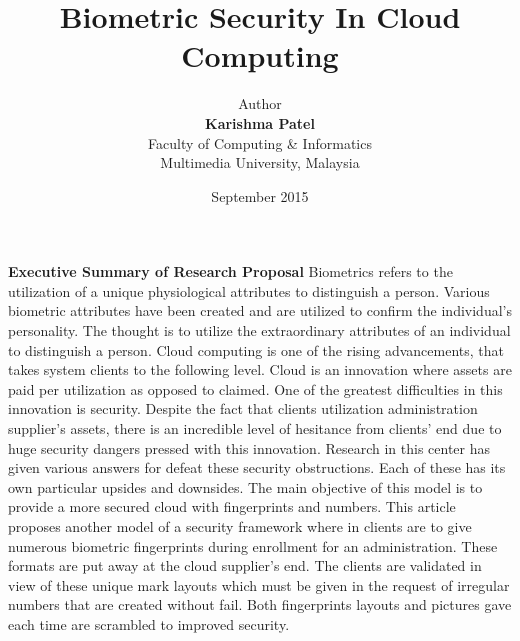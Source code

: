 \documentclass[12pt]{article}
\title{\textbf{Biometric Security In Cloud Computing}}
\date{September 2015}
\author{
Author\\
\textbf{Karishma Patel}\\
Faculty of Computing \& Informatics\\
Multimedia University, Malaysia}
\begin{document}
\begin{titlepage}
\maketitle
\end{titlepage}

\textbf{\large Executive Summary of Research Proposal} \newline \newline \newline
Biometrics refers to the utilization of a unique physiological attributes to distinguish a person. Various biometric attributes have been created and are utilized to confirm the individual's personality. The thought is to utilize the extraordinary attributes of an individual to distinguish a person. Cloud computing is one of the rising advancements, that takes system clients to the following level. Cloud is an innovation where assets are paid per utilization as opposed to claimed. One of the greatest difficulties in this innovation is security. Despite the fact that clients utilization administration supplier's assets, there is an incredible level of hesitance from clients' end due to huge security dangers pressed with this innovation. Research in this center has given various answers for defeat these security obstructions. Each of these has its own particular upsides and downsides. The main objective of this model is to provide a more secured cloud with fingerprints and numbers. This article proposes another model of a security framework where in clients are to give numerous biometric fingerprints during enrollment for an administration. These formats are put away at the cloud supplier's end. The clients are validated in view of these unique mark layouts which must be given in the request of irregular numbers that are created without fail. Both fingerprints layouts and pictures gave each time are scrambled to improved security. \newpage
\end{document}
